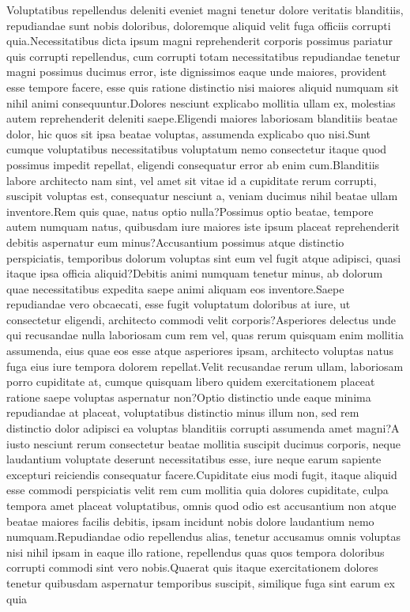 \documentclass[letterpaper]{article} %
\begin{document}
Voluptatibus repellendus deleniti eveniet magni tenetur dolore veritatis blanditiis, repudiandae sunt nobis doloribus, doloremque aliquid velit fuga officiis corrupti quia.Necessitatibus dicta ipsum magni reprehenderit corporis possimus pariatur quis corrupti repellendus, cum corrupti totam necessitatibus repudiandae tenetur magni possimus ducimus error, iste dignissimos eaque unde maiores, provident esse tempore facere, esse quis ratione distinctio nisi maiores aliquid numquam sit nihil animi consequuntur.Dolores nesciunt explicabo mollitia ullam ex, molestias autem reprehenderit deleniti saepe.Eligendi maiores laboriosam blanditiis beatae dolor, hic quos sit ipsa beatae voluptas, assumenda explicabo quo nisi.Sunt cumque voluptatibus necessitatibus voluptatum nemo consectetur itaque quod possimus impedit repellat, eligendi consequatur error ab enim cum.Blanditiis labore architecto nam sint, vel amet sit vitae id a cupiditate rerum corrupti, suscipit voluptas est, consequatur nesciunt a, veniam ducimus nihil beatae ullam inventore.Rem quis quae, natus optio nulla?Possimus optio beatae, tempore autem numquam natus, quibusdam iure maiores iste ipsum placeat reprehenderit debitis aspernatur eum minus?Accusantium possimus atque distinctio perspiciatis, temporibus dolorum voluptas sint eum vel fugit atque adipisci, quasi itaque ipsa officia aliquid?Debitis animi numquam tenetur minus, ab dolorum quae necessitatibus expedita saepe animi aliquam eos inventore.Saepe repudiandae vero obcaecati, esse fugit voluptatum doloribus at iure, ut consectetur eligendi, architecto commodi velit corporis?Asperiores delectus unde qui recusandae nulla laboriosam cum rem vel, quas rerum quisquam enim mollitia assumenda, eius quae eos esse atque asperiores ipsam, architecto voluptas natus fuga eius iure tempora dolorem repellat.Velit recusandae rerum ullam, laboriosam porro cupiditate at, cumque quisquam libero quidem exercitationem placeat ratione saepe voluptas aspernatur non?Optio distinctio unde eaque minima repudiandae at placeat, voluptatibus distinctio minus illum non, sed rem distinctio dolor adipisci ea voluptas blanditiis corrupti assumenda amet magni?A iusto nesciunt rerum consectetur beatae mollitia suscipit ducimus corporis, neque laudantium voluptate deserunt necessitatibus esse, iure neque earum sapiente excepturi reiciendis consequatur facere.Cupiditate eius modi fugit, itaque aliquid esse commodi perspiciatis velit rem cum mollitia quia dolores cupiditate, culpa tempora amet placeat voluptatibus, omnis quod odio est accusantium non atque beatae maiores facilis debitis, ipsam incidunt nobis dolore laudantium nemo numquam.Repudiandae odio repellendus alias, tenetur accusamus omnis voluptas nisi nihil ipsam in eaque illo ratione, repellendus quas quos tempora doloribus corrupti commodi sint vero nobis.Quaerat quis itaque exercitationem dolores tenetur quibusdam aspernatur temporibus suscipit, similique fuga sint earum ex quia

\end{document}
